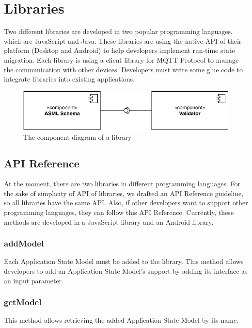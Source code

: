 \section{Libraries}
Two different libraries are developed in two popular programming languages, which are JavaScript and Java. These libraries are using the native API of their platform (Desktop and Android) to help developers implement run-time state migration. Each library is using a client library for MQTT Protocol to manage the communication with other devices. Developers must write some glue code to integrate libraries into existing applications.

\FloatBarrier
\begin{figure}[H]
    \includegraphics[width=\linewidth]{../figures/libraries-diagram.pdf}
    \centering
    \caption{The component diagram of a library}
    \label{fig:libraries-component}
\end{figure}
\FloatBarrier

\subsection{API Reference}
At the moment, there are two libraries in different programming languages. For the sake of simplicity of API of libraries, we drafted an API Reference guideline, so all libraries have the same API. Also, if other developers want to support other programming languages, they can follow this API Reference. Currently, these methods are developed in a JavaScript library and an Android library.

\subsubsection{addModel}
Each Application State Model must be added to the library. This method allows developers to add an Application State Model's support by adding its interface as an input parameter.

\subsubsection{getModel}
This method allows retrieving the added Application State Model by its name.


